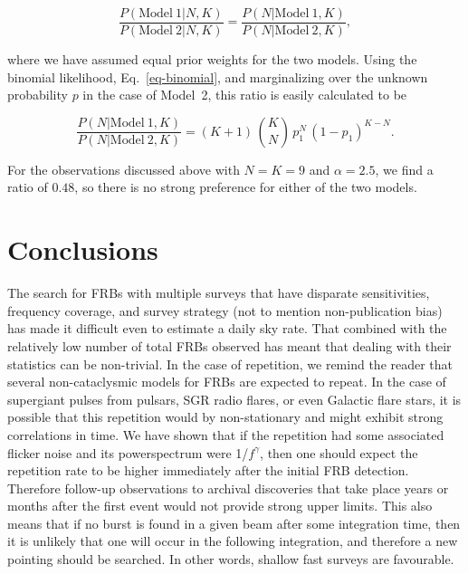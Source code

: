\documentclass[useAMS,usenatbib]{mn2e}
\begin{document}
   
\begin{equation}
	\frac{P(\mathrm{Model}~1|N,K)}{P(\mathrm{Model}~2|N,K)} = \frac{P(N|\mathrm{Model}~1,K)}{P(N|\mathrm{Model}~2,K)},
\end{equation}

\noindent where we have assumed equal prior weights for the two models. 
Using the binomial likelihood, Eq.~\eqref{eq-binomial}, and
marginalizing over the unknown probability $p$ in the case of Model~2, 
this ratio is easily calculated to be

\begin{equation}
\frac{P(N|\mathrm{Model}~1,K)}{P(N|\mathrm{Model}~2,K)} = (K + 1) \, \binom{K}{N} \, p_1^N \, \left(1 - p_1\right)^{K-N}.
\end{equation}

\noindent For the observations discussed above with $N = K = 9$ 
and $\alpha = 2.5$, we find a ratio of $0.48$, so there is
no strong preference for either of the two models.

\section{Conclusions}

The search for FRBs with multiple surveys that have disparate sensitivities, 
frequency coverage, and survey strategy (not to mention non-publication bias) 
has made it difficult even to 
estimate a daily sky rate. 
That combined with the relatively low number of total FRBs observed 
has meant that dealing with their statistics can be non-trivial. In 
the case of repetition, we remind the reader that several non-cataclysmic 
models for FRBs are expected to repeat. In the case of supergiant 
pulses from pulsars, SGR radio flares, or even Galactic flare stars, it is possible 
that this repetition would by non-stationary and might exhibit strong correlations 
in time. We have shown that if the repetition had some associated flicker noise 
and its powerspectrum were 1/$f^\gamma$, then one should expect the repetition 
rate to be higher immediately after the initial FRB detection. Therefore follow-up 
observations to archival discoveries that take place years or 
months after the first event would not provide strong upper limits. 
This also means that if no burst is found in a given beam after some 
integration time, then it is unlikely that one will occur in the following integration, and therefore 
a new pointing should be searched. In other words, shallow fast surveys are favourable. 
\end{document}
